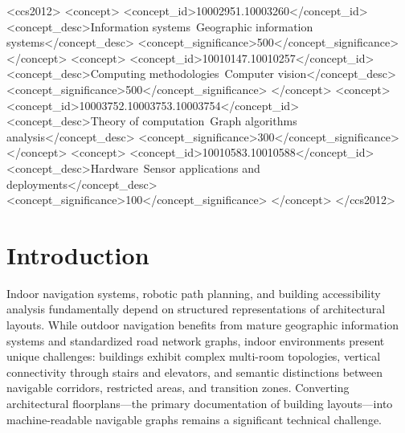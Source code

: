 \documentclass[manuscript,screen,review]{acmart}
\begin{document}
\begin{CCSXML}
<ccs2012>
 <concept>
  <concept_id>10002951.10003260</concept_id>
  <concept_desc>Information systems~Geographic information systems</concept_desc>
  <concept_significance>500</concept_significance>
 </concept>
 <concept>
  <concept_id>10010147.10010257</concept_id>
  <concept_desc>Computing methodologies~Computer vision</concept_desc>
  <concept_significance>500</concept_significance>
 </concept>
 <concept>
  <concept_id>10003752.10003753.10003754</concept_id>
  <concept_desc>Theory of computation~Graph algorithms analysis</concept_desc>
  <concept_significance>300</concept_significance>
 </concept>
 <concept>
  <concept_id>10010583.10010588</concept_id>
  <concept_desc>Hardware~Sensor applications and deployments</concept_desc>
  <concept_significance>100</concept_significance>
 </concept>
</ccs2012>
\end{CCSXML}



\maketitle

\section{Introduction}
\label{sec:introduction}

Indoor navigation systems, robotic path planning, and building accessibility analysis fundamentally depend on structured representations of architectural layouts. While outdoor navigation benefits from mature geographic information systems and standardized road network graphs, indoor environments present unique challenges: buildings exhibit complex multi-room topologies, vertical connectivity through stairs and elevators, and semantic distinctions between navigable corridors, restricted areas, and transition zones. Converting architectural floorplans---the primary documentation of building layouts---into machine-readable navigable graphs remains a significant technical challenge.
\end{document}
